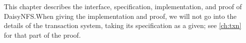 This chapter describes the interface, specification, implementation, and
proof of DaisyNFS.\@ When giving the implementation and proof, we will not go into
the details of the transaction system, taking its specification as a given; see
\cref{ch:txn} for that part of the proof.









